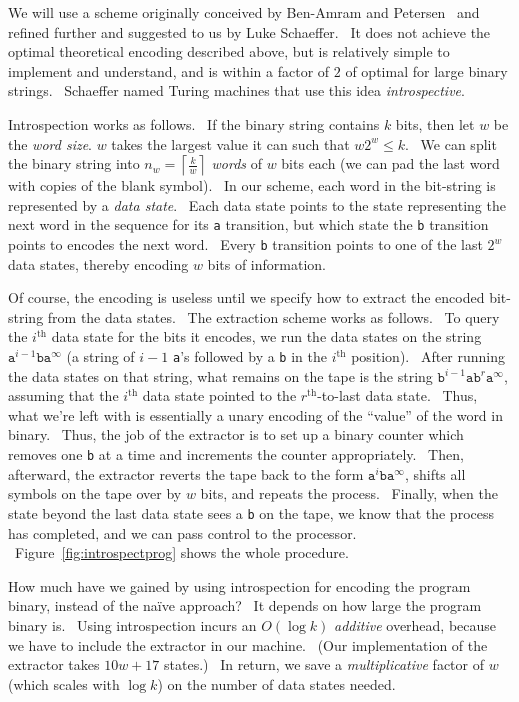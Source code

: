 \documentclass[11pt]{article}
\begin{document}
We will use a scheme originally conceived by Ben-Amram and Petersen~\cite{benamram} and refined further and suggested to us by Luke Schaeffer. \ It does not achieve the optimal theoretical encoding described above, but is relatively simple to implement and understand, and is within a factor of $2$ of optimal for large binary strings. \ Schaeffer named Turing machines that use this idea \emph{introspective}.

Introspection works as follows. \ If the binary string contains $k$ bits, then let $w$ be the \emph{word size}. $w$ takes the largest value it can such that $w2^w \le k$. \ We can split the binary string into $n_w = \left \lceil{\frac{k}{w}}\right \rceil$ \emph{words} of $w$ bits each (we can pad the last word with copies of the blank symbol). \ In our scheme, each word in the bit-string is represented by a \emph{data state}. \ Each data state points to the state representing the next word in the sequence for its \texttt{a} transition, but which state the \texttt{b} transition points to encodes the next word. \ Every \texttt{b} transition points to one of the last $2^w$ data states, thereby encoding $w$ bits of information.

Of course, the encoding is useless until we specify how to extract the encoded bit-string from the data states. \ The extraction scheme works as follows. \ To query the $i^\textrm{th}$ data state for the bits it encodes, we run the data states on the string $\texttt{a}^{i-1}\texttt{b}\texttt{a}^{\infty}$ (a string of $i-1$ \texttt{a}'s followed by a \texttt{b} in the $i^\textrm{th}$ position). \ After running the data states on that string, what remains on the tape is the string $\texttt{b}^{i-1}\texttt{a}\texttt{b}^r\texttt{a}^{\infty}$, assuming that the $i^\textrm{th}$ data state pointed to the $r^\textrm{th}$-to-last data state. \ Thus, what we're left with is essentially a unary encoding of the ``value'' of the word in binary. \ Thus, the job of the extractor is to set up a binary counter which removes one \texttt{b} at a time and increments the counter appropriately. \ Then, afterward, the extractor reverts the tape back to the form $\texttt{a}^i\texttt{b}\texttt{a}^{\infty}$, shifts all symbols on the tape over by $w$ bits, and repeats the process. \ Finally, when the state beyond the last data state sees a \texttt{b} on the tape, we know that the process has completed, and we can pass control to the processor. \ Figure~\ref{fig:introspectprog} shows the whole procedure.

How much have we gained by using introspection for encoding the program binary, instead of the na\"ive approach? \ It depends on how large the program binary is. \ Using introspection incurs an $O(\log k)$ \emph{additive} overhead, because we have to include the extractor in our machine. \ (Our implementation of the extractor takes $10w + 17$ states.) \ In return, we save a \emph{multiplicative} factor of $w$ (which scales with $\log k$) on the number of data states needed.
\end{document}
